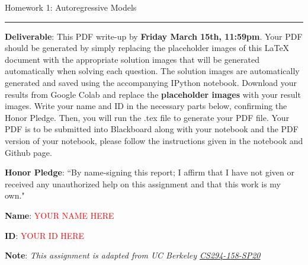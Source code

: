 \documentclass{article}
\newcommand{\ruleskip}{\bigskip\hrule\bigskip}
\begin{document}
\pagestyle{myheadings} 

{\huge
\noindent Homework 1: Autoregressive Models}
\ruleskip

{\bf Deliverable}: This PDF write-up by {\bf Friday March 15th, 11:59pm}.  Your PDF should be generated by simply replacing the placeholder images of this LaTeX document with the appropriate solution images that will be generated automatically when solving each question. The solution images are automatically generated and saved using the accompanying IPython notebook. Download your results from Google Colab and replace the \textbf{placeholder images} with your result images. Write your name and ID in the necessary parts below, confirming the Honor Pledge. Then, you will run the .tex file to generate your PDF file. Your PDF is to be submitted into Blackboard along with your notebook and the PDF version of your notebook, please follow the instructions given in the notebook and Github page.

{\bf Honor Pledge}: ``By name-signing this report; I affirm that I have not given or received any unauthorized help on this assignment and that this work is my own."

{\bf Name}: \textcolor{red}{YOUR NAME HERE}

{\bf ID}: \textcolor{red}{YOUR ID HERE}

\vspace{.1in}

{\bf Note}: \textit{This assignment is adapted from UC Berkeley \href{https://sites.google.com/view/berkeley-cs294-158-sp20/home}{CS294-158-SP20}}
\vspace{.2in}

\end{document}
